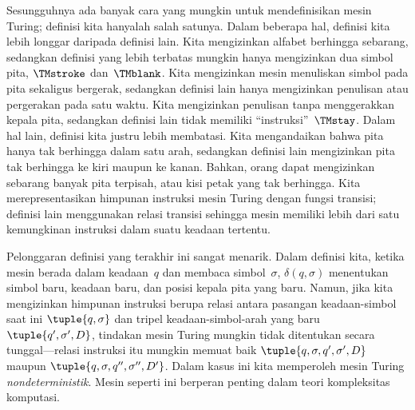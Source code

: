 \documentclass[../../../include/open-logic-section]{subfiles}
\begin{document}

Sesungguhnya ada banyak cara yang mungkin untuk mendefinisikan mesin Turing;
definisi kita hanyalah salah satunya. Dalam beberapa hal, definisi kita lebih
longgar daripada definisi lain. Kita mengizinkan alfabet berhingga sebarang,
sedangkan definisi yang lebih terbatas mungkin hanya mengizinkan dua simbol
pita, $\TMstroke$ dan~$\TMblank$. Kita mengizinkan mesin menuliskan simbol pada
pita sekaligus bergerak, sedangkan definisi lain hanya mengizinkan penulisan
atau pergerakan pada satu waktu. Kita mengizinkan penulisan tanpa menggerakkan
kepala pita, sedangkan definisi lain tidak memiliki ``instruksi''~$\TMstay$.
Dalam hal lain, definisi kita justru lebih membatasi. Kita mengandaikan bahwa
pita hanya tak berhingga dalam satu arah, sedangkan definisi lain mengizinkan
pita tak berhingga ke kiri maupun ke kanan. Bahkan, orang dapat mengizinkan
sebarang banyak pita terpisah, atau kisi petak yang tak berhingga. Kita
merepresentasikan himpunan instruksi mesin Turing dengan fungsi transisi;
definisi lain menggunakan relasi transisi sehingga mesin memiliki lebih dari
satu kemungkinan instruksi dalam suatu keadaan tertentu.

Pelonggaran definisi yang terakhir ini sangat menarik. Dalam definisi kita,
ketika mesin berada dalam keadaan~$q$ dan membaca simbol~$\sigma$,
$\delta(q, \sigma)$ menentukan simbol baru, keadaan baru, dan posisi kepala
pita yang baru. Namun, jika kita mengizinkan himpunan instruksi berupa relasi
antara pasangan keadaan-simbol saat ini $\tuple{q, \sigma}$ dan tripel
keadaan-simbol-arah yang baru $\tuple{q', \sigma', D}$, tindakan mesin Turing
mungkin tidak ditentukan secara tunggal---relasi instruksi itu mungkin memuat
baik $\tuple{q, \sigma, q', \sigma', D}$ maupun
$\tuple{q, \sigma, q'', \sigma'', D'}$. Dalam kasus ini kita memperoleh mesin
Turing \emph{nondeterministik}. Mesin seperti ini berperan penting dalam teori
kompleksitas komputasi.
\end{document}
